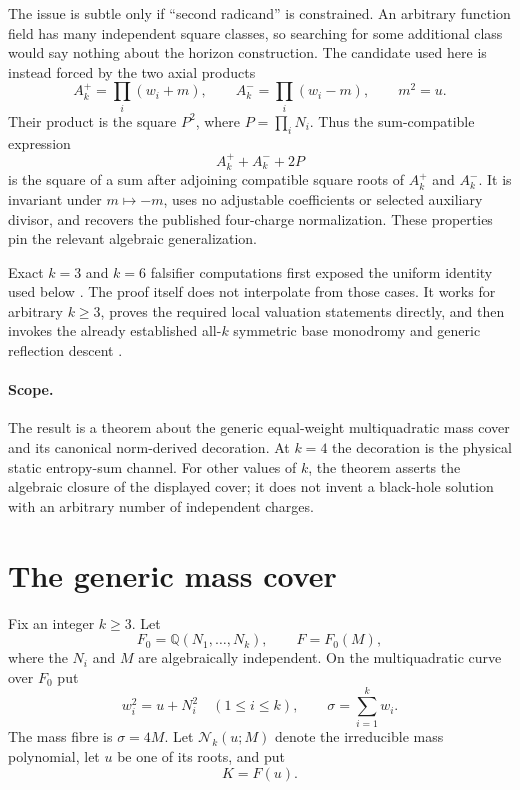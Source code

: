 \documentclass[11pt,a4paper]{article}
\theoremstyle{definition}
\theoremstyle{remark}
\newcommand{\Q}{\mathbb{Q}}
\begin{document}
The issue is subtle only if ``second radicand'' is constrained.  An arbitrary
function field has many independent square classes, so searching for some
additional class would say nothing about the horizon construction.  The
candidate used here is instead forced by the two axial products
\[
 A_k^+=\prod_i(w_i+m),\qquad A_k^-=\prod_i(w_i-m),
 \qquad m^2=u.
\]
Their product is the square $P^2$, where $P=\prod_iN_i$.  Thus the
sum-compatible expression
\[
 A_k^++A_k^-+2P
\]
is the square of a sum after adjoining compatible square roots of $A_k^+$
and $A_k^-$.  It is invariant under $m\mapsto-m$, uses no adjustable
coefficients or selected auxiliary divisor, and recovers the published
four-charge normalization.  These properties pin the relevant algebraic
generalization.

Exact $k=3$ and $k=6$ falsifier computations first exposed the uniform
identity used below \cite{KillTest}.  The proof itself does not interpolate
from those cases.  It works for arbitrary $k\geq3$, proves the required local
valuation statements directly, and then invokes the already established
all-$k$ symmetric base monodromy \cite{WeightedMonodromy} and generic
reflection descent \cite{ReflectionDescent}.

\paragraph{Scope.}
The result is a theorem about the generic equal-weight multiquadratic mass
cover and its canonical norm-derived decoration.  At $k=4$ the decoration is
the physical static entropy-sum channel.  For other values of $k$, the theorem
asserts the algebraic closure of the displayed cover; it does not invent a
black-hole solution with an arbitrary number of independent charges.

\section{The generic mass cover}
\label{sec:setup}

Fix an integer $k\geq3$.  Let
\[
 F_0=\Q(N_1,\ldots,N_k),\qquad F=F_0(M),
\]
where the $N_i$ and $M$ are algebraically independent.  On the
multiquadratic curve over $F_0$ put
\begin{equation}
 w_i^2=u+N_i^2\quad(1\leq i\leq k),
 \qquad \sigma=\sum_{i=1}^kw_i.
 \label{eq:curve}
\end{equation}
The mass fibre is $\sigma=4M$.  Let $\mathcal N_k(u;M)$ denote the irreducible
mass polynomial, let $u$ be one of its roots, and put
\[
 K=F(u).
\]
\end{document}

